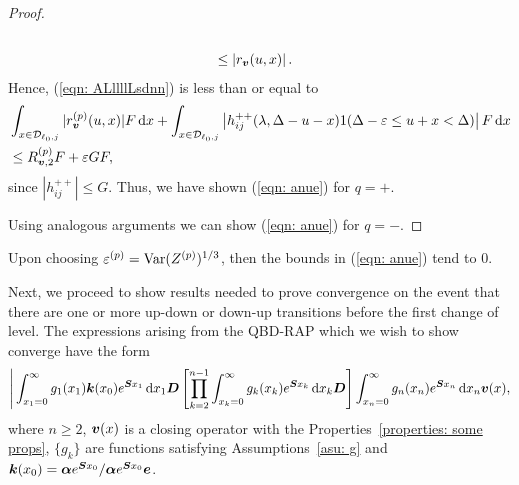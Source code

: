 \begin{proof}
\begin{align}
					\\&\leq \left| r_{\boldsymbol v}(u,x) \right|.
				\end{align}
				Hence, (\ref{eqn: ALllllLsdnn}) is less than or equal to 
                \begin{align}
                	& \int_{x\in\mathcal{D}_{\ell_0,j}} |r_{\boldsymbol v}^{(p)}(u,x)| F \, \mathrm{d} x
                	+ \int_{x\in\mathcal{D}_{\ell_0,j}} \left| h_{ij}^{++}(\lambda,\Delta-u-x) 1(\Delta-\varepsilon \leq u+x < \Delta) \right| F \, \mathrm{d} x\nonumber 
                	\\&\leq R^{(p)}_{{\boldsymbol v},2} F + \varepsilon GF, \nonumber 
                \end{align}
				since \(|h_{ij}^{++}|\leq G\). Thus, we have shown (\ref{eqn: anue}) for \(q=+\). 

                Using analogous arguments we can show  (\ref{eqn: anue}) for \(q=-\).
\end{proof}
Upon choosing \(\varepsilon^{(p)}=\mathrm{Var}(Z^{(p)})^{1/3}\), then the bounds in (\ref{eqn: anue}) tend to 0. 

Next, we proceed to show results needed to prove convergence on the event that there are one or more up-down or down-up transitions before the first change of level. The expressions arising from the QBD-RAP which we wish to show converge have the form 
\begin{align}
	\Bigg| \int_{x_1=0}^\infty g_1(x_1) \boldsymbol k(x_0) e^{\boldsymbol{S}x_1}\, \mathrm{d} x_1\boldsymbol D 
			\left[\prod_{k=2}^{n-1}\int_{x_k=0}^\infty g_k(x_k) e^{\boldsymbol{S}x_k} \, \mathrm{d} x_k \boldsymbol D\right] \int_{x_n=0}^\infty g_{n}(x_n) e^{\boldsymbol{S}x_n} \, \mathrm{d} x_n {\boldsymbol v}(x), \label{eqn: salkdjgaf} 
\end{align}
where \(n\geq 2\), \(\boldsymbol v(x)\) is a closing operator with the Properties~\ref{properties: some props}, \(\{g_k\}\) are functions satisfying Assumptions~\ref{asu: g} and \(\boldsymbol k(x_0)=\boldsymbol\alpha e^{\boldsymbol Sx_0}/\boldsymbol\alpha e^{\boldsymbol Sx_0}\boldsymbol e\). 


